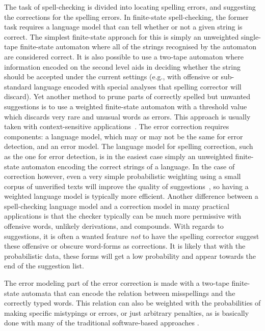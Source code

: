 \documentclass[a4paper,12pt]{article}
\begin{document}
The task of spell-checking is divided into locating spelling errors, and
suggesting the corrections for the spelling errors. In finite-state
spell-checking, the former task requires a language model that can tell whether
or not a given string is correct. The simplest finite-state approach for this
is simply an unweighted single-tape finite-state automaton where all of the
strings recognised by the automaton are considered correct. It is also possible
to use a two-tape automaton where information encoded on the second level aids
in deciding whether the string should be accepted under the current settings
(e.g., with offensive or sub-standard language encoded with special analyses
that spelling corrector will discard). Yet another method to prune parts of
correctly spelled but unwanted suggestions is to use a weighted finite-state
automaton with a threshold value which discards very rare and unusual words as
errors. This approach is usually taken with context-sensitive
applications~\cite[]{otero/2007}. The error correction requires components: a
language model, which may or may not be the same for error detection, and an
error model. The language model for spelling correction, such as the one for
error detection, is in the easiest case simply an unweighted finite-state
automaton encoding the correct strings of a language. In the case of correction
however, even a very simple probabilistic weighting using a small corpus of
unverified texts will improve the quality of
suggestions~\cite[]{pirinen/2010/lrec}, so having a weighted language model is
typically more efficient. Another difference between a spell-checking language
model and a correction model in many practical applications is that the checker
typically can be much more permissive with offensive words, unlikely
derivations, and compounds.  With regards to suggestions, it is often a wanted
feature \emph{not} to have the spelling corrector suggest these offensive or
obscure word-forms as corrections. It is likely that with the probabilistic
data, these forms will get a low probability and appear towards the end of the
suggestion list.

The error modeling part of the error correction is made with a two-tape
finite-state automata that can encode the relation between misspellings and
the correctly typed words. This relation can also be weighted with the
probabilities of making specific mistypings or errors, or just arbitrary
penalties, as is basically done with many of the traditional software-based
approaches \cite[such as][]{Hunspell/manual}.
\end{document}
